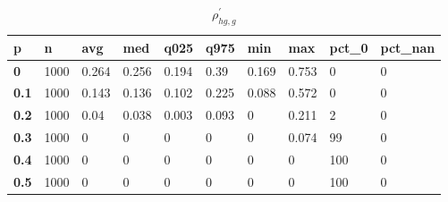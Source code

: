 \begin{table}[h]
 \centering 
\footnotesize
\caption{$\rho_{hg,g}^\prime $}
\label{tab:alphahgg}
\begin{tabular}[h]{|l|l|l|l|l|l|l|l|l|l|
    } \hline
\textbf{ p} & \textbf{ n} & \textbf{ avg} & \textbf{ med} & \textbf{ q025} & \textbf{ q975} & \textbf{ min} & \textbf{ max} & \textbf{ pct\_0} & \textbf{ pct\_nan}
    \\ \hline
  \textbf{  0} & 1000 & 0.264 & 0.256 & 0.194 &  0.39 & 0.169 & 0.753 &   0 & 0
    \\ \hline
  \textbf{0.1} & 1000 & 0.143 & 0.136 & 0.102 & 0.225 & 0.088 & 0.572 &   0 & 0
    \\ \hline
  \textbf{0.2} & 1000 &  0.04 & 0.038 & 0.003 & 0.093 &     0 & 0.211 &   2 & 0
    \\ \hline
  \textbf{0.3} & 1000 &     0 &     0 &     0 &     0 &     0 & 0.074 &  99 & 0
    \\ \hline
  \textbf{0.4} & 1000 &     0 &     0 &     0 &     0 &     0 &     0 & 100 & 0
    \\ \hline
  \textbf{0.5} & 1000 &     0 &     0 &     0 &     0 &     0 &     0 & 100 & 0
    \\ \hline
 \end{tabular}
 \end{table}
